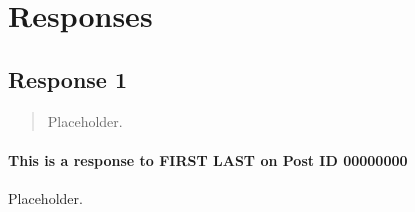 
\section{Responses}
  \subsection{Response 1}
    \begin{quotation}
      Placeholder.
    \end{quotation}

    \paragraph{This is a response to FIRST LAST on Post ID 00000000}
      Placeholder.
